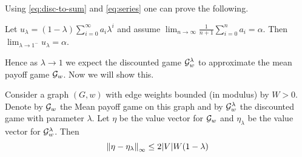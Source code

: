 Using \eqref{eq:disc-to-sum} and \eqref{eq:series} one can prove the following.
\begin{theorem}
    Let $u_\lambda=(1-\lambda) \sum_{i=0}^\infty a_i \lambda^i$ and assume $\lim_{n \to \infty} \frac{1}{n+1}\sum_{i=0}^n a_i = \alpha$. Then $\lim_{\lambda \to 1^-} u_\lambda = \alpha$.
\end{theorem}

Hence as $\lambda \to 1$ we expect the discounted game $\mathcal{G}^\lambda_w$ to approximate the mean payoff game $\mathcal{G}_w$. Now we will show this.

\begin{theorem}
    \label{thm:mean-to-discounted}
    Consider a graph $(G,w)$ with edge weights bounded (in modulus) by $W > 0$. Denote by $\mathcal{G}_w$ the Mean payoff game on this graph and by $\mathcal{G}^\lambda_w$ the discounted game with parameter $\lambda$. Let $\eta$ be the value vector for $\mathcal{G}_w$ and $\eta_\lambda$ be the value vector for $\mathcal{G}^\lambda_w$. Then
    \[
        \left\lVert\eta - \eta_{\lambda}\right\rVert_\infty \leq 2|V|W (1-\lambda)
    \]
\end{theorem}
